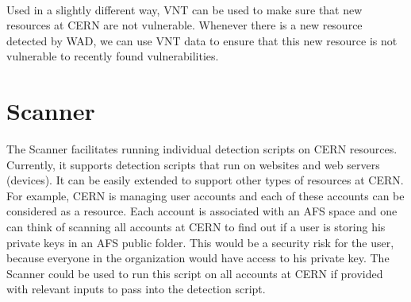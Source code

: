 \paragraph{}
Used in a slightly different way, VNT can be used to make sure that new resources at CERN are not vulnerable. Whenever there is a new resource detected by WAD, we can use VNT data to ensure that this new resource is not vulnerable to recently found vulnerabilities.
\section{Scanner}
The Scanner facilitates running individual detection scripts on CERN resources. Currently, it supports detection scripts that run on websites and web servers (devices). It can be easily extended to support other types of resources at CERN. For example, CERN is managing user accounts and each of these accounts can be considered as a resource. Each account is associated with an AFS space and one can think of scanning all accounts at CERN to find out if a user is storing his private keys in an AFS public folder. This would be a security risk for the user, because everyone in the organization would have access to his private key. The Scanner could be used to run this script on all accounts at CERN if provided with relevant inputs to pass into the detection script.
\\